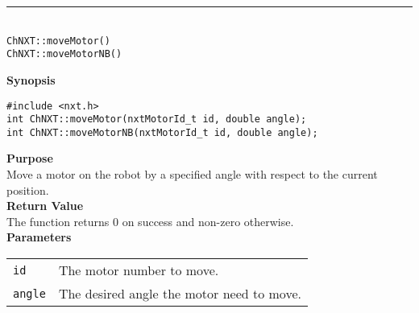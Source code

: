 \noindent
\vspace{5pt}
\rule{4.5in}{0.015in}\\
\noindent
{\LARGE \texttt{ChNXT::moveMotor()} }\\
{\LARGE \texttt{ChNXT::moveMotorNB()} }\\


\noindent
{\bf Synopsis}
\begin{lstlisting}
#include <nxt.h>
int ChNXT::moveMotor(nxtMotorId_t id, double angle);
int ChNXT::moveMotorNB(nxtMotorId_t id, double angle);
\end{lstlisting}

\noindent
{\bf Purpose}\\
Move a motor on the robot by a specified angle with respect to the
current position.\\

\noindent
{\bf Return Value}\\
The function returns 0 on success and non-zero otherwise.\\

\noindent
{\bf Parameters}\\
\vspace{-0.1in}
\begin{description}
\item               
\begin{tabular}{p{20 mm}p{135 mm}}
\texttt{id} & The motor number to move. \\
\texttt{angle} & The desired angle the motor need to move. \\
\end{tabular}
\end{description}

